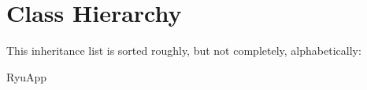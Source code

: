 \section{Class Hierarchy}
This inheritance list is sorted roughly, but not completely, alphabetically\+:\begin{DoxyCompactList}
\item Ryu\+App\begin{DoxyCompactList}
\item {}
\end{DoxyCompactList}
\end{DoxyCompactList}
